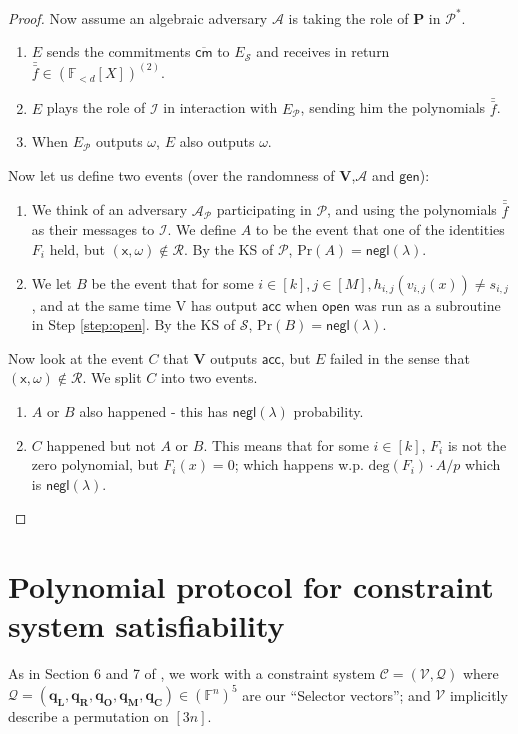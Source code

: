 \documentclass[11pt]{article} %
\newcommand{\F}{\ensuremath{\mathbb F}\xspace}
\newcommand{\adv}{\ensuremath{\mathcal A}\xspace}
\newcommand{\cmm}{\ensuremath{\mathsf{\overline{cm}}}\xspace}
\newcommand{\open}{\ensuremath{\mathsf{open}}\xspace}
\renewcommand{\deg}{\ensuremath{\mathrm{deg}}\xspace}
\newcommand{\negl}{\ensuremath{\mathsf{negl}(\lambda)}\xspace}
\newcommand{\acc}{\ensuremath{\mathsf{acc}}\xspace}
\newcommand{\gen}{\ensuremath{\mathsf{gen}}\xspace}
\newcommand{\prv}{\ensuremath{\mathsf{\mathbf{P}}}\xspace}
\newcommand{\verpc}{\ensuremath{\mathrm{V}}\xspace}%
\newcommand{\ideal}{\ensuremath{\mathcal{I}}\xspace}
\newcommand{\inp}{\ensuremath{\mathsf{x}}\xspace}
\newcommand{\wit}{\ensuremath{\omega}\xspace}
\newcommand{\ver}{\ensuremath{\mathsf{\mathbf{V}}}\xspace}
\newcommand{\rel}{\ensuremath{\mathcal{R}}\xspace}
\newcommand{\ext}{\ensuremath{E}\xspace}
\newcommand{\polysofdeg}[1]{\ensuremath{\F_{< #1}[X]}\xspace}
\newcommand{\prot}{\ensuremath{\mathscr{P}}\xspace}
\newcommand{\PCscheme}{\ensuremath{\mathscr{S}}\xspace}
\newcommand{\protprime}{\ensuremath{\mathscr{P^*}}\xspace}
\newcommand{\selleft}{\ensuremath{\mathbf{q_L}}\xspace}
\newcommand{\selright}{\ensuremath{\mathbf{q_R}}\xspace}
\newcommand{\selout}{\ensuremath{\mathbf{q_O}}\xspace}
\newcommand{\selmult}{\ensuremath{\mathbf{q_M}}\xspace}
\newcommand{\selconst}{\ensuremath{\mathbf{q_C}}\xspace}
\newcommand{\selectors}{\ensuremath{\mathcal{Q}}\xspace}
\newcommand{\vars}{\ensuremath{\mathcal{V}}\xspace}
\newcommand{\constsystem}{\ensuremath{\mathscr{C}}\xspace}
\newcommand{\prob}{\ensuremath{\mathrm{Pr}}\xspace}
\newcommand{\extprot}{\ensuremath{E_{\prot}}\xspace}
\newcommand{\extpc}{\ensuremath{E_{\PCscheme}}\xspace}
\newcommand{\advprot}{\ensuremath{\mathcal A_{\prot}}\xspace}
\newcommand{\ff}{\ensuremath{\bar{\bar{f}}}\xspace}
\begin{document}
\begin{proof}
Now assume an algebraic adversary \adv is taking the role of \prv in \protprime.
\begin{enumerate}
 \item \ext sends the commitments $\cmm$  to \extpc and receives in return $\ff \in \left(\polysofdeg{d}\right)^{(2)}$.
 \item \ext plays the role of \ideal in interaction with \extprot, sending him the polynomials \ff.
 \item When \extprot outputs \wit, \ext also outputs \wit.
\end{enumerate}

Now let us define two events (over the randomness of \ver,\adv and \gen):
\begin{enumerate}
 \item We think of an adversary \advprot participating in \prot, and using the polynomials \ff as their messages to \ideal. We define $A$ to be the event that one of the identities $F_i$ held, but $(\inp,\wit)\notin \rel$. By the KS of \prot, $\prob(A)=\negl$.
 \item We let $B$ be the event that for some $i\in [k],j\in [M], h_{i,j}(v_{i,j}(x))\neq s_{i,j}$, and at the same time \verpc has output \acc when \open was run as a subroutine in Step \ref{step:open}. By the KS of \PCscheme, $\prob(B)=\negl$.
\end{enumerate}

Now look at the event $C$ that \ver outputs \acc, but \ext failed in the sense that $(\inp,\wit)\notin \rel$.
We split $C$ into two events.
\begin{enumerate}
 \item $A$ or $B$ also happened - this has \negl probability.
 \item $C$ happened but not $A$ or $B$. This means that for some $i\in [k]$, $F_i$ is not the zero polynomial, but $F_i(x)=0$; which happens w.p. $\deg(F_i)\cdot A/p$ which is \negl.
\end{enumerate}



\end{proof}




\section{Polynomial protocol for constraint system satisfiability}
As in Section 6 and 7 of \cite{plonk}, we work with a constraint system $\constsystem=(\vars,\selectors)$ 
where $\selectors = (\selleft,\selright,\selout,\selmult,\selconst)\in (\F^n)^5$ are our ``Selector vectors'';
and \vars implicitly describe a permutation on $[3n]$.
\end{document}
